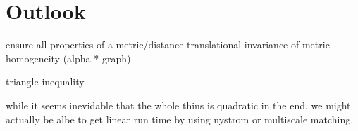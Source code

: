 \section{Outlook}

ensure all properties of a metric/distance
translational invariance of metric
homogeneity (alpha * graph)

triangle inequality

while it seems inevidable that the whole thins is quadratic in the end, we might actually be albe to get linear run time by using nystrom or multiscale matching.
